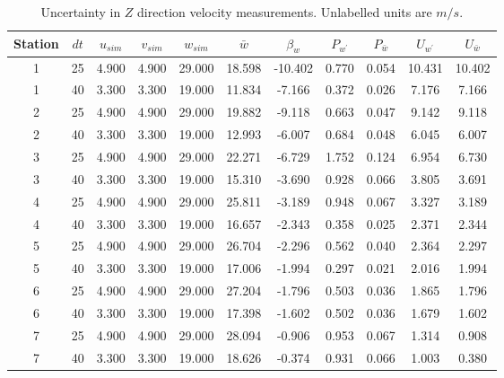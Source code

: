 \begin{table}[H]
\begin{center}
\begin{tabular}{|ccccccccccc|}
	\hline
	Station & $dt$ & $u_{sim}$ & $v_{sim}$ & $w_{sim}$ & $\bar{w}$ & $\beta_w$ & $P_{w^{\prime}}$ & $P_{\bar{w}}$ & $U_{w^{\prime}}$ & $U_{\bar{w}}$\\
	\hline
	1 & 25 & 4.900 & 4.900 & 29.000 & 18.598 & -10.402 & 0.770 & 0.054 & 10.431 & 10.402\\
	1 & 40 & 3.300 & 3.300 & 19.000 & 11.834 & -7.166 & 0.372 & 0.026 & 7.176 & 7.166\\
	2 & 25 & 4.900 & 4.900 & 29.000 & 19.882 & -9.118 & 0.663 & 0.047 & 9.142 & 9.118\\
	2 & 40 & 3.300 & 3.300 & 19.000 & 12.993 & -6.007 & 0.684 & 0.048 & 6.045 & 6.007\\
	3 & 25 & 4.900 & 4.900 & 29.000 & 22.271 & -6.729 & 1.752 & 0.124 & 6.954 & 6.730\\
	3 & 40 & 3.300 & 3.300 & 19.000 & 15.310 & -3.690 & 0.928 & 0.066 & 3.805 & 3.691\\
	4 & 25 & 4.900 & 4.900 & 29.000 & 25.811 & -3.189 & 0.948 & 0.067 & 3.327 & 3.189\\
	4 & 40 & 3.300 & 3.300 & 19.000 & 16.657 & -2.343 & 0.358 & 0.025 & 2.371 & 2.344\\
	5 & 25 & 4.900 & 4.900 & 29.000 & 26.704 & -2.296 & 0.562 & 0.040 & 2.364 & 2.297\\
	5 & 40 & 3.300 & 3.300 & 19.000 & 17.006 & -1.994 & 0.297 & 0.021 & 2.016 & 1.994\\
	6 & 25 & 4.900 & 4.900 & 29.000 & 27.204 & -1.796 & 0.503 & 0.036 & 1.865 & 1.796\\
	6 & 40 & 3.300 & 3.300 & 19.000 & 17.398 & -1.602 & 0.502 & 0.036 & 1.679 & 1.602\\
	7 & 25 & 4.900 & 4.900 & 29.000 & 28.094 & -0.906 & 0.953 & 0.067 & 1.314 & 0.908\\
	7 & 40 & 3.300 & 3.300 & 19.000 & 18.626 & -0.374 & 0.931 & 0.066 & 1.003 & 0.380\\
	\hline
\end{tabular}
\caption{Uncertainty in $Z$ direction velocity measurements. Unlabelled units are $m/s$.}
\label{table:uncertainties_w}
\end{center}
\end{table}
